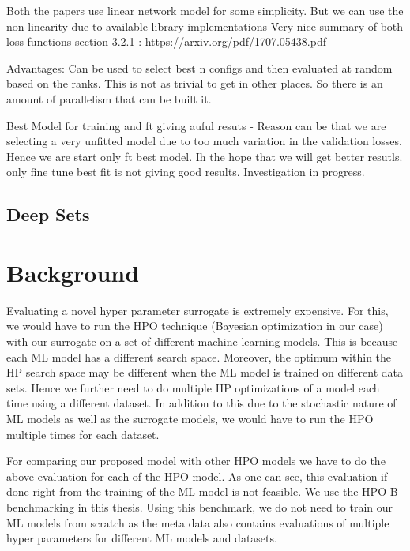 \documentclass[11pt]{report}
\begin{document}
    Both the papers use linear network model for some simplicity. But we can use the non-linearity due to available library
        implementations
    Very nice summary of both loss functions section 3.2.1 : https://arxiv.org/pdf/1707.05438.pdf 

Advantages:
    Can be used to select best n configs and then evaluated at random based on the ranks. This is not as trivial to get in other
    places. So there is an amount of parallelism that can be built it.

Best Model for training and ft giving auful resuts - Reason can be that we are selecting a very unfitted model due to too much variation in the validation losses.
Hence we are start only ft best model. Ih the hope that we will get better resutls.
only fine tune best fit is not giving good results. Investigation in progress. 

\fi

\section{Deep Sets}


\chapter{Background}

Evaluating a novel hyper parameter surrogate is extremely expensive.
For this,  we would have to run the HPO technique (Bayesian optimization in our case) with our surrogate on a set of different machine learning models.
This is because each ML model has a different search space.
Moreover,  the optimum within the HP search space may be different when the ML model is trained on different data sets.
Hence we further need to do multiple HP optimizations of a model each time using a different dataset.
In addition to this due to the stochastic nature of ML models as well as the surrogate models, 
we would have to run the HPO multiple times for each dataset.

For comparing our proposed model with other HPO models we have to do the above evaluation for each of the HPO model.
As one can see,  this evaluation if done right from the training of the ML model is not feasible.
We use the HPO-B~\cite{DBLP:journals/corr/abs-2106-06257} benchmarking in this thesis.
Using this benchmark,  we do not need to train our ML models from scratch as the meta data also contains evaluations of multiple hyper parameters for different ML models and datasets.
\end{document}
